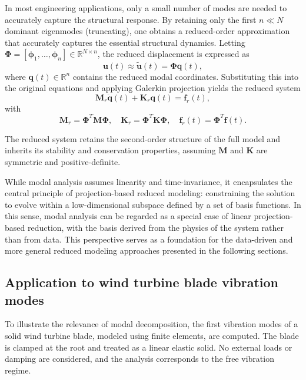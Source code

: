 In most engineering applications, only a small number of modes are needed to accurately capture the structural response. By retaining only the first \( n \ll N \) dominant eigenmodes (truncating), one obtains a reduced-order approximation that accurately captures the essential structural dynamics. Letting \( \boldsymbol{\Phi} = [\boldsymbol{\phi}_1, \dots, \boldsymbol{\phi}_n] \in \mathbb{R}^{N \times n} \), the reduced displacement is expressed as
\begin{equation}
\mathbf{u}(t) \approx \mathbf{\tilde{u}}(t) = \boldsymbol{\Phi}\mathbf{q}(t),
\end{equation}
where \( \mathbf{q}(t) \in \mathbb{R}^n \) contains the reduced modal coordinates. Substituting this into the original equations and applying Galerkin projection yields the reduced system
\begin{equation}
\mathbf{M}_r \ddot{\mathbf{q}}(t) + \mathbf{K}_r \mathbf{q}(t) = \mathbf{f}_r(t),
\end{equation}
with
\begin{equation}
\mathbf{M}_r = \boldsymbol{\Phi}^T \mathbf{M} \boldsymbol{\Phi}, \quad
\mathbf{K}_r = \boldsymbol{\Phi}^T \mathbf{K} \boldsymbol{\Phi}, \quad
\mathbf{f}_r(t) = \boldsymbol{\Phi}^T \mathbf{f}(t).
\end{equation}

The reduced system retains the second-order structure of the full model and inherits its stability and conservation properties, assuming \( \mathbf{M} \) and \( \mathbf{K} \) are symmetric and positive-definite.

While modal analysis assumes linearity and time-invariance, it encapsulates the central principle of projection-based reduced modeling: constraining the solution to evolve within a low-dimensional subspace defined by a set of basis functions. In this sense, modal analysis can be regarded as a special case of linear projection-based reduction, with the basis derived from the physics of the system rather than from data. This perspective serves as a foundation for the data-driven and more general reduced modeling approaches presented in the following sections.

\subsection{Application to wind turbine blade vibration modes}

To illustrate the relevance of modal decomposition, the first vibration modes of a solid wind turbine blade, modeled using finite elements, are computed. The blade is clamped at the root and treated as a linear elastic solid. No external loads or damping are considered, and the analysis corresponds to the free vibration regime.

